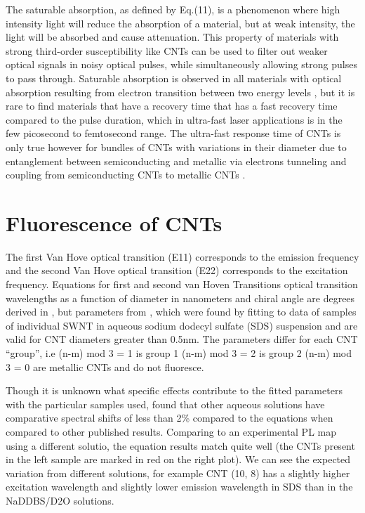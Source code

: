 The saturable absorption, as defined by Eq.(11), is a phenomenon where high intensity light will reduce the absorption of a material, but at weak intensity, the light will be absorbed and cause attenuation. This property of materials with strong third-order susceptibility like CNTs can be used to filter out weaker optical signals in noisy optical pulses, while simultaneously allowing strong pulses to pass through. Saturable absorption is observed in all materials with optical absorption resulting from electron transition between two energy levels \cite{thomsen}, but it is rare to find materials that have a recovery time that has a fast recovery time compared to the pulse duration, which in ultra-fast laser applications is in the few picosecond to femtosecond range. The ultra-fast response time of CNTs  is only true however for bundles of CNTs with variations in their diameter due to entanglement between semiconducting and metallic via electrons tunneling and coupling from semiconducting CNTs to metallic CNTs \cite{gambetta}.

\section{Fluorescence of CNTs}
The first Van Hove optical transition (E11)
corresponds to the emission frequency and the
second Van Hove optical transition (E22) corresponds
to the excitation frequency. Equations for first and second van Hoven Transitions optical transition wavelengths as a function of diameter in
nanometers and chiral angle are degrees derived in \cite{bachilo}, but  parameters from \cite{weisman}, which were found by fitting
to data of samples of individual SWNT in aqueous sodium dodecyl sulfate (SDS) suspension and are valid for
CNT diameters greater than 0.5nm.
The parameters differ for each CNT “group”, i.e  (n-m) mod 3 = 1 is group 1
(n-m) mod 3 = 2 is group 2
(n-m) mod 3 = 0 are metallic CNTs and do not fluoresce.

Though it is unknown what specific effects contribute to the fitted parameters with the particular samples used, \cite{weisman}found that other
aqueous solutions have comparative spectral shifts of less than 2\% compared to the equations when compared to other published
results. Comparing to an experimental PL map using a different solutio\cite{giordani}, the equation results match quite well (the CNTs present in
the left sample are marked in red on the right plot). We can see the expected variation from different solutions, for example CNT (10,
8) has a slightly higher excitation wavelength and slightly lower emission wavelength in SDS than in the NaDDBS/D2O solutions.

